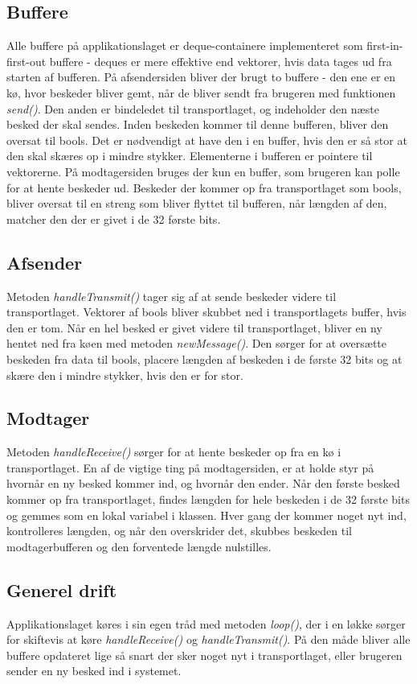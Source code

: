 \subsection{Buffere}
Alle buffere på applikationslaget er deque-containere implementeret som first-in-first-out buffere - deques er mere effektive end vektorer, hvis data tages ud fra starten af bufferen. På afsendersiden bliver der brugt to buffere - den ene er en kø, hvor beskeder bliver gemt, når de bliver sendt fra brugeren med funktionen \textit{send()}. Den anden er bindeledet til transportlaget, og indeholder den næste besked der skal sendes. Inden beskeden kommer til denne bufferen, bliver den oversat til bools. Det er nødvendigt at have den i en buffer, hvis den er så stor at den skal skæres op i mindre stykker. Elementerne i bufferen er pointere til vektorerne. På modtagersiden bruges der kun en buffer, som brugeren kan polle for at hente beskeder ud. Beskeder der kommer op fra transportlaget som bools, bliver oversat til en streng som bliver flyttet til bufferen, når længden af den, matcher den der er givet i de 32 første bits.

\subsection{Afsender}
Metoden \textit{handleTransmit()} tager sig af at sende beskeder videre til transportlaget. Vektorer af bools bliver skubbet ned i transportlagets buffer, hvis den er tom. Når en hel besked er givet videre til transportlaget, bliver en ny hentet ned fra køen med metoden \textit{newMessage()}. Den sørger for at oversætte beskeden fra data til bools, placere længden af beskeden i de første 32 bits og at skære den i mindre stykker, hvis den er for stor.

\subsection{Modtager}
Metoden \textit{handleReceive()} sørger for at hente beskeder op fra en kø i transportlaget. En af de vigtige ting på modtagersiden, er at holde styr på hvornår en ny besked kommer ind, og hvornår den ender. Når den første besked kommer op fra transportlaget, findes længden for hele beskeden i de 32 første bits og gemmes som en lokal variabel i klassen. Hver gang der kommer noget nyt ind, kontrolleres længden, og når den overskrider det, skubbes beskeden til modtagerbufferen og den forventede længde nulstilles. 

\subsection{Generel drift}
Applikationslaget køres i sin egen tråd med metoden \textit{loop()}, der i en løkke sørger for skiftevis at køre \textit{handleReceive()} og \textit{handleTransmit()}. På den måde bliver alle buffere opdateret lige så snart  der sker noget nyt i transportlaget, eller brugeren sender en ny besked ind i systemet.